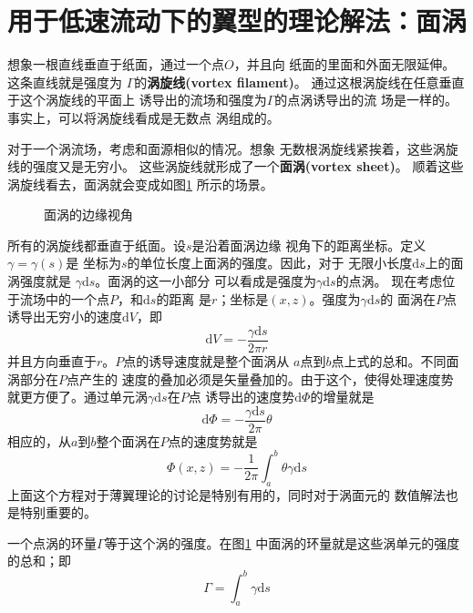 \section{用于低速流动下的翼型的理论解法：面涡}
想象一根直线垂直于纸面，通过一个点$O$，并且向
纸面的里面和外面无限延伸。这条直线就是强度为
$\Gamma$的{\bfseries 涡旋线(vortex filament)}。
通过这根涡旋线在任意垂直于这个涡旋线的平面上
诱导出的流场和强度为$\Gamma$的点涡诱导出的流
场是一样的。事实上，可以将涡旋线看成是无数点
涡组成的。

对于一个涡流场，考虑和面源相似的情况。想象
无数根涡旋线紧挨着，这些涡旋线的强度又是无穷小。
这些涡旋线就形成了一个{\bfseries 面涡(vortex sheet)}。
顺着这些涡旋线看去，面涡就会变成如图\ref{fig:vortex sheet}
所示的场景。
\begin{figure}[!ht]
  \centering
  
  \caption{面涡的边缘视角}
  \label{fig:vortex sheet}
\end{figure}
所有的涡旋线都垂直于纸面。设$s$是沿着面涡边缘
视角下的距离坐标。定义$\gamma=\gamma(s)$是
坐标为$s$的单位长度上面涡的强度。因此，对于
无限小长度$\mathrm{d}s$上的面涡强度就是
$\gamma\mathrm{d}s$。面涡的这一小部分
可以看成是强度为$\gamma\mathrm{d}s $的点涡。
现在考虑位于流场中的一个点$P$，和$\mathrm{d}s$的距离
是$r$；坐标是$(x,z)$。强度为$\gamma\mathrm{d}s$的
面涡在$P$点诱导出无穷小的速度$\mathrm{d}V$，即
\[
  \mathrm{d}V=-\frac{\gamma \mathrm{d}s }{2\pi r }
\]
并且方向垂直于$r$。$P$点的诱导速度就是整个面涡从
$a$点到$b$点上式的总和。不同面涡部分在$P$点产生的
速度的叠加必须是矢量叠加的。由于这个，使得处理速度势
就更方便了。通过单元涡$\gamma \mathrm{d}s $在$P$点
诱导出的速度势$\mathrm{d} \Phi$的增量就是
\[
  \mathrm{d}\Phi=-\frac{\gamma \mathrm{d}s }{2\pi}\theta
\]
相应的，从$a$到$b $整个面涡在$P$点的速度势就是
\[
  \Phi(x,z)=- \frac{1}{2\pi}\int _a^b \theta \gamma \mathrm{d}s 
\]
上面这个方程对于薄翼理论的讨论是特别有用的，同时对于涡面元的
数值解法也是特别重要的。

一个点涡的环量$\Gamma$等于这个涡的强度。在图\ref{fig:vortex sheet}
中面涡的环量就是这些涡单元的强度的总和；即
\[
  \Gamma=\int _a^b \gamma \mathrm{d}s 
\]

